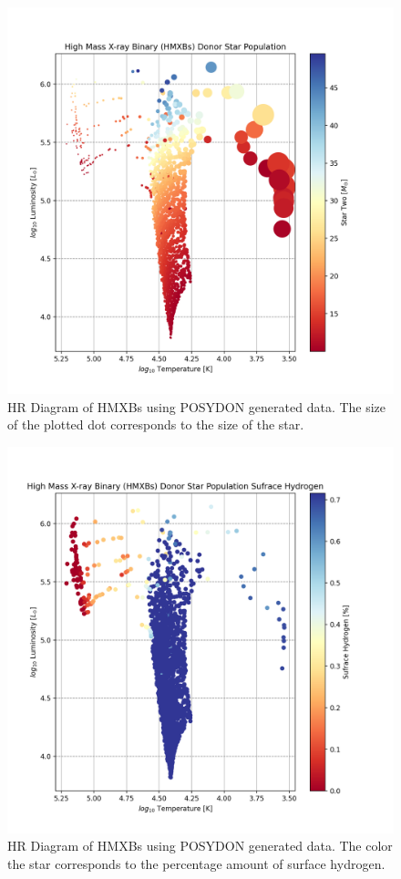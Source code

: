 \documentclass[12pt, a4paper]{article}
\begin{document}
            
        \begin{figure}[H] 
            \centering
            \includegraphics[width=.7\textwidth]{figs/GeneratedFigs/VelaX-1/HMXBHRPopulation.png}
            \caption{HR Diagram of HMXBs using POSYDON generated data. The size of the plotted dot corresponds to the size of the star.}
            \label{HMXBsHRDiagram}
        \end{figure}

        \begin{figure}[H] 
            \centering
            \includegraphics[width=\textwidth]{figs/GeneratedFigs/VelaX-1/HMXBsSurfaceCompHRDiagram.png}
            \caption{HR Diagram of HMXBs using POSYDON generated data. The color the star corresponds to the percentage amount of surface hydrogen.}
            \label{HMXBsSurfaceCompHRDiagram}
        \end{figure}
\end{document}
